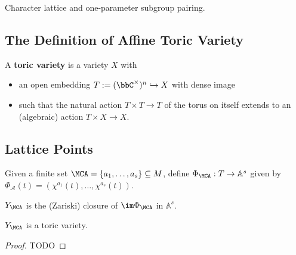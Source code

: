 \begin{definition}
  \label{1-1-char-cochar-pairing}
  \leanok

  Character lattice and one-parameter subgroup pairing.
\end{definition}


\subsection{The Definition of Affine Toric Variety}


\begin{definition}
  \label{1-1-3-aff-tor-var}
  \leanok

  A {\bf toric variety} is a variety $X$ with
  \begin{itemize}
    \item an open embedding $T := (\bbC^\times)^n \hookrightarrow X$ with dense image
    \item such that the natural action $T \times T \to T$ of the torus on itself extends to an (algebraic) action $T \times X \to X$.
  \end{itemize}
\end{definition}


\subsection{Lattice Points}


\begin{definition}
  \label{1-1-phiA}

  Given a finite set $\MCA = \{a_1, \dotsc, a_s\} \subseteq M$, define $\Phi_\MCA : T \to \mathbb{A}^s$ given by $\Phi_{\mathcal A} (t) = (\chi^{a_1} (t), \dotsc, \chi^{a_s} (t))$.
\end{definition}


\begin{definition}
  \label{1-1-7-ya}

  $Y_\MCA$ is the (Zariski) closure of $\im \Phi_\MCA$ in $\mathbb A^s$.
\end{definition}


\begin{proposition}
  \label{1-1-8-aff-tor-var-ya}

  $Y_\MCA$ is a toric variety.
\end{proposition}
\begin{proof}

  TODO
\end{proof}

